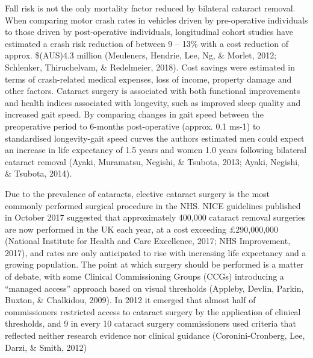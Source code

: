 \documentclass[
  english,
  man,floatsintext]{apa6}
\begin{document}
Fall risk is not the only mortality factor reduced by bilateral cataract removal.
When comparing motor crash rates in vehicles driven by pre-operative individuals to those driven by post-operative individuals, longitudinal cohort studies have estimated a crash risk reduction of between 9 -- 13\% with a cost reduction of approx.
\$(AUS)4.3 million (Meuleners, Hendrie, Lee, Ng, \& Morlet, 2012; Schlenker, Thiruchelvam, \& Redelmeier, 2018).
Cost savings were estimated in terms of crash-related medical expenses, loss of income, property damage and other factors.
Cataract surgery is associated with both functional improvements and health indices associated with longevity, such as improved sleep quality and increased gait speed.
By comparing changes in gait speed between the preoperative period to 6-months post-operative (approx. 0.1 ms-1) to standardised longevity-gait speed curves the authors estimated men could expect an increase in life expectancy of 1.5 years and women 1.0 years following bilateral cataract removal (Ayaki, Muramatsu, Negishi, \& Tsubota, 2013; Ayaki, Negishi, \& Tsubota, 2014).

Due to the prevalence of cataracts, elective cataract surgery is the most commonly performed surgical procedure in the NHS.
NICE guidelines published in October 2017 suggested that approximately 400,000 cataract removal surgeries are now performed in the UK each year, at a cost exceeding £290,000,000 (National Institute for Health and Care Excellence, 2017; NHS Improvement, 2017), and rates are only anticipated to rise with increasing life expectancy and a growing population.
The point at which surgery should be performed is a matter of debate, with some Clinical Commissioning Groups (CCGs) introducing a \enquote{managed access} approach based on visual thresholds (Appleby, Devlin, Parkin, Buxton, \& Chalkidou, 2009).
In 2012 it emerged that almost half of commissioners restricted access to cataract surgery by the application of clinical thresholds, and 9 in every 10 cataract surgery commissioners used criteria that reflected neither research evidence nor clinical guidance (Coronini-Cronberg, Lee, Darzi, \& Smith, 2012)
\end{document}
